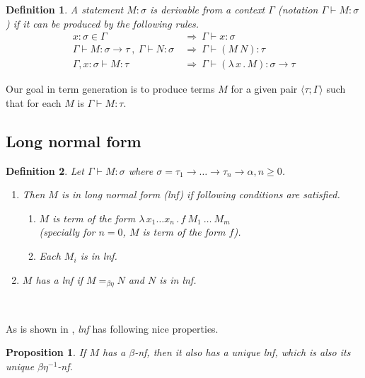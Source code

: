 \documentclass{sig-alternate}
\newtheorem{definition}{Definition}
\newtheorem{proposition}{Proposition}
\newcommand{\tur}[3]{#1\vdash{}#2 \colon #3}
\newcommand{\turst}[3]{$#1\vdash{}#2:#3$\xspace}
\newcommand{\GMS}{\turst{\Gamma}{M}{\sigma}}
\newcommand{\then}{\Rightarrow\xspace}
\newcommand{\lamb}[2]{( \lambda \, #1 \, . \, #2 )}
\newcommand{\lam}[2]{\lambda \, #1 \, . \, #2}
\newcommand{\bnf}{$\beta$-\textit{nf}\xspace}
\newcommand{\beenf}{$\beta\eta^{-1}$-\textit{nf}\xspace}
\newcommand{\lnf}{\textit{lnf}\xspace}
\newcommand{\ar}{\rightarrow\xspace}
\newcommand{\ul}[2]{\langle #1 ; #2 \rangle}
\begin{document}
\begin{definition}
A statement $M\colon\sigma$ is \textit{derivable from}
a context $\Gamma$ (notation 
\mbox{$\Gamma\vdash{}M\colon\sigma$}) 
if it can be produced by the following rules.
\begin{align*}
x : \sigma \in \Gamma &~\then~ \tur{\Gamma}{x}{\sigma}\\
\tur{\Gamma}{M}{\sigma \ar \tau}~,~\tur{\Gamma}{N}{\sigma} 
&~\then~ \tur{\Gamma}{(M~N)}{\tau}\\  
\tur{\Gamma,x:\sigma}{M}{\tau}
&~\then~ \tur{\Gamma}{\lamb{x}{M}}{\sigma \ar \tau} 
\end{align*}
\end{definition}

Our goal in term generation is to produce terms $M$
for a given pair $\ul{\tau}{\Gamma}$
such that for each $M$ is $\tur{\Gamma}{M}{\tau}$.

\subsection{Long normal form}
\label{lnf}


\begin{definition}
Let \GMS where 
$\sigma = \tau_1 \ar \dots \ar \tau_n \ar \alpha, n \geq 0$.
	\begin{enumerate}
	  \item	
		Then $M$ is in \textit{long normal form} (\lnf) if following 
		conditions are satisfied.
		\begin{enumerate}
		 \item $M$ is term of the form $\lam{x_1 \dots x_n}{f~M_1~\dots~M_m}$\\
		  (specially for $n = 0$, $M$ is term of the form $f$).
		 \item Each $M_i$ is in \lnf.
		\end{enumerate}	
	  \item 
	    $M$ has a \lnf if $M =_{\beta\eta} N$ and $N$ is in \lnf.
	\end{enumerate}
\end{definition}~

As is shown in \cite{barendregt10}, \lnf has following nice properties.

\begin{proposition}
If $M$ has a \bnf, 
then it also has a unique \lnf, 
which is also its unique \beenf.
\end{proposition}
\end{document}
